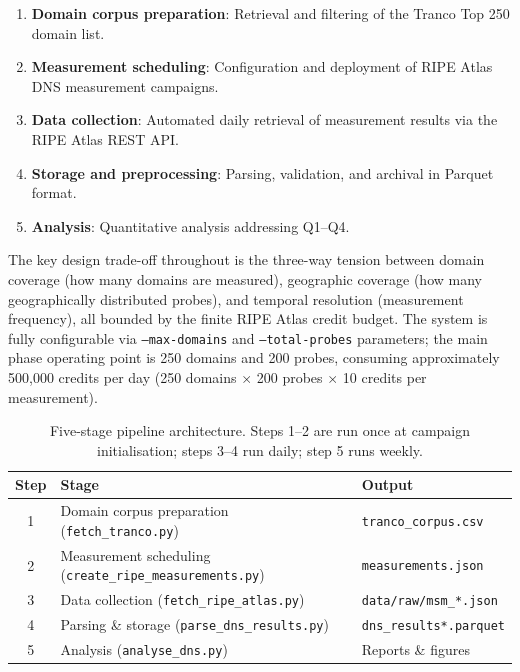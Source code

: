 \begin{enumerate}
  \item \textbf{Domain corpus preparation}: Retrieval and filtering of the Tranco Top 250 domain list.
  \item \textbf{Measurement scheduling}: Configuration and deployment of RIPE Atlas \ac{DNS} measurement campaigns.
  \item \textbf{Data collection}: Automated daily retrieval of measurement results via the RIPE Atlas REST API.
  \item \textbf{Storage and preprocessing}: Parsing, validation, and archival in Parquet format.
  \item \textbf{Analysis}: Quantitative analysis addressing Q1--Q4.
\end{enumerate}

The key design trade-off throughout is the three-way tension between domain coverage (how many domains are measured), geographic coverage (how many geographically distributed probes), and temporal resolution (measurement frequency), all bounded by the finite RIPE Atlas credit budget. The system is fully configurable via \texttt{--max-domains} and \texttt{--total-probes} parameters; the main phase operating point is 250 domains and 200 probes, consuming approximately 500,000 credits per day (250 domains $\times$ 200 probes $\times$ 10 credits per measurement).

\begin{table}[H]
\centering
\small
\begin{tabular}{c l l}
\toprule
\textbf{Step} & \textbf{Stage} & \textbf{Output} \\
\midrule
1 & Domain corpus preparation (\texttt{fetch\_tranco.py})         & \texttt{tranco\_corpus.csv} \\
2 & Measurement scheduling (\texttt{create\_ripe\_measurements.py}) & \texttt{measurements.json} \\
3 & Data collection (\texttt{fetch\_ripe\_atlas.py})               & \texttt{data/raw/msm\_*.json} \\
4 & Parsing \& storage (\texttt{parse\_dns\_results.py})           & \texttt{dns\_results*.parquet} \\
5 & Analysis (\texttt{analyse\_dns.py})                            & Reports \& figures \\
\bottomrule
\end{tabular}
\caption{Five-stage pipeline architecture. Steps 1--2 are run once at campaign initialisation; steps 3--4 run daily; step 5 runs weekly.}
\label{tab:pipeline_stages}
\end{table}

